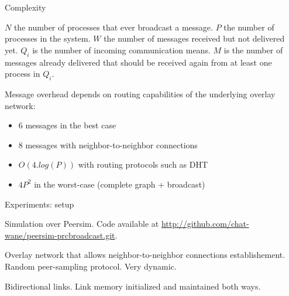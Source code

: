 \documentclass[10pt, xcolor={usenames, dvipsnames}]{beamer}
\begin{document}
\begin{frame}{Complexity}

  \begin{table}
    \begin{center}
      \caption{\scriptsize $N$ the number of processes that ever broadcast a
        message. $P$ the number of processes in the system. $W$ the number of
        messages received but not delivered yet. $Q_i$ is the number of incoming
        communication means. $M$ is the number of messages already delivered
        that should be received again from at least one process in $Q_i$.}
      
    \end{center}
  \end{table}

  \vspace{2em}
  
  Message overhead depends on routing capabilities of the underlying overlay
  network:
  \begin{itemize}
  \item 6 messages in the best case
  \item 8 messages with neighbor-to-neighbor connections
  \item $O(4.log(P))$ with routing protocols such as DHT
  \item $4P^2$ in the worst-case (complete graph + broadcast)
  \end{itemize}
  

\end{frame}

\begin{frame}{Experiments: setup}
  
  Simulation over Peersim. Code available at \url{http://github.com/chat-wane/peersim-prcbroadcast.git}.

  Overlay network that allows neighbor-to-neighbor connections
  establishement. Random peer-sampling protocol. Very dynamic.
  
  Bidirectional links. Link memory initialized and maintained both ways.
  
  

\end{frame}
\end{document}
